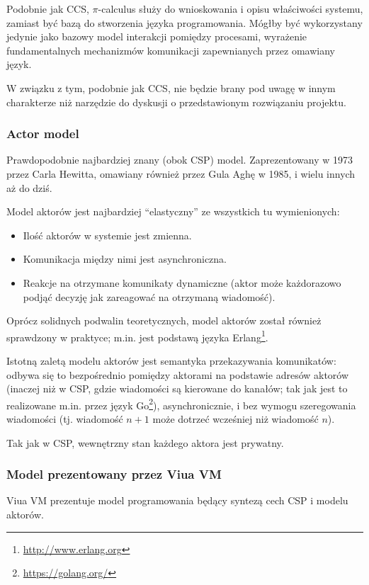 \documentclass[11pt,oneside,a4paper,titlepage,onecolumn]{article}
\begin{document}
Podobnie jak CCS, $\pi$-calculus służy do wnioskowania i opisu właściwości systemu, zamiast być
bazą do stworzenia języka programowania. Mógłby być wykorzystany jedynie jako bazowy model interakcji
pomiędzy procesami, wyrażenie fundamentalnych mechanizmów komunikacji zapewnianych przez omawiany
język.

W związku z tym, podobnie jak CCS, nie będzie brany pod uwagę w innym charakterze niż narzędzie do
dyskusji o przedstawionym rozwiązaniu projektu.

\subsubsection{Actor model}

Prawdopodobnie najbardziej znany (obok CSP) model. Zaprezentowany w 1973 przez Carla Hewitta, omawiany
również przez Gula Aghę w 1985, i wielu innych aż do dziś.

Model aktorów jest najbardziej ``elastyczny'' ze wszystkich tu wymienionych:

\begin{itemize}
\item Ilość aktorów w systemie jest zmienna.
\item Komunikacja między nimi jest asynchroniczna.
\item Reakcje na otrzymane komunikaty dynamiczne (aktor może każdorazowo podjąć decyzję jak zareagować
    na otrzymaną wiadomość).
\end{itemize}

Oprócz solidnych podwalin teoretycznych, model aktorów został również sprawdzony w praktyce; m.in. jest
podstawą języka Erlang\footnote{\url{http://www.erlang.org}}.

Istotną zaletą modelu aktorów jest semantyka przekazywania komunikatów: odbywa się to bezpośrednio pomiędzy
aktorami na podstawie adresów aktorów (inaczej niż w CSP, gdzie wiadomości są kierowane do kanałów; tak jak
jest to realizowane m.in. przez język Go\footnote{\url{https://golang.org/}}), asynchronicznie, i
bez wymogu szeregowania wiadomości (tj. wiadomość $n+1$ może dotrzeć wcześniej niż wiadomość $n$).

Tak jak w CSP, wewnętrzny stan każdego aktora jest prywatny.

\subsubsection{Model prezentowany przez Viua VM}

Viua VM prezentuje model programowania będący syntezą cech CSP i modelu aktorów.
\end{document}
